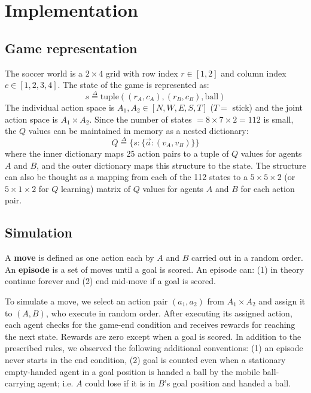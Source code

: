 \documentclass[conference]{IEEEtran}
\begin{document}
\section{Implementation}
\subsection{Game representation}
The soccer world is a $2\times 4$ grid with row index $r\in [1,2]$ and column index $c\in [1,2,3,4]$. The state of the game is represented as:
\begin{equation}
s \stackrel{\Delta}{=} \text{tuple}((r_A,c_A), (r_B,c_B), \text{ball})
\end{equation}
The individual action space is $A_1, A_2 \in [N, W, E, S, T]$ ($T=$ stick) and the joint action space is $A_1\times A_2$. Since the number of states $ = 8\times 7\times 2 = 112$ is small, the $Q$ values can be maintained in memory as a nested dictionary:
\begin{equation}
Q \stackrel{\Delta}{=} \{s: \{\vec{a}: (v_A, v_B)\}\} 
\end{equation}
where the inner dictionary maps 25 action pairs to a tuple of $Q$ values for agents $A$ and $B$, and the outer dictionary maps this structure to the state. The structure can also be thought as a mapping from each of the 112 states to a $5\times 5\times 2$ (or $5\times 1\times 2$ for $Q$ learning) matrix of $Q$ values for agents $A$ and $B$ for each action pair. 
\subsection{Simulation}
A {\bf move} is defined as one action each by $A$ and $B$ carried out in a random order. An {\bf episode} is a set of moves until a goal is scored. An episode can: (1) in theory continue forever and (2) end mid-move if a goal is scored.

To simulate a move, we select an action pair $(a_1, a_2)$ from $A_1\times A_2$ and assign it to $(A, B)$, who execute in random order. After executing its assigned action, each agent checks for the game-end condition and receives rewards for reaching the next state. Rewards are zero except when a goal is scored. In addition to the prescribed rules, we observed the following additional conventions: (1) an episode never starts in the end condition, (2) goal is counted even when a stationary empty-handed agent in a goal position is handed a ball by the mobile ball-carrying agent; i.e. $A$ could lose if it is in $B$'s goal position and handed a ball.
\end{document}
